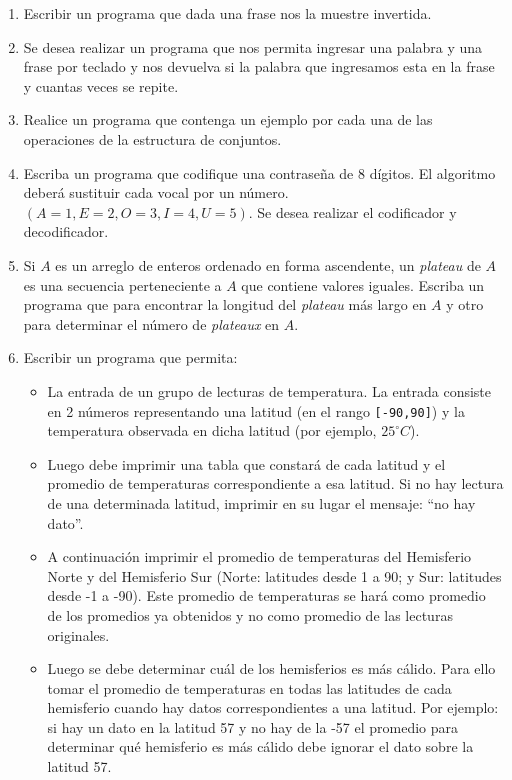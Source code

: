 \documentclass[a4paper,10pt]{article}
\begin{document}
\begin{enumerate}
\item Escribir un programa que dada una frase nos la muestre invertida.

\item Se desea realizar un programa que nos permita ingresar una palabra y una frase por teclado y nos devuelva si la palabra que ingresamos esta en la frase y cuantas veces se repite.

\item Realice un programa que contenga un ejemplo por cada una de las operaciones de la estructura de conjuntos.

\item Escriba un programa que codifique una contrase\~na de 8 d\'igitos. El algoritmo deber\'a sustituir cada vocal por un n\'umero. $(A=1, E=2, O=3, I=4, U=5)$. Se desea realizar el codificador y decodificador.

\item Si $A$ es un arreglo de enteros ordenado en forma ascendente, un \emph{plateau} de $A$ es una secuencia perteneciente a $A$ que contiene valores iguales. Escriba un programa que para encontrar la longitud del \emph{plateau} m\'as largo en $A$ y otro para determinar el n\'umero de \emph{plateaux} en $A$.

\item Escribir un programa que permita:
    \begin{itemize}
        \item[a-] La entrada de un grupo de lecturas de temperatura. La entrada consiste en 2 n\'umeros representando una latitud (en el rango \verb=[-90,90]=) y la temperatura observada en dicha latitud (por ejemplo, $25^\circ C$).
        \item[b-] Luego debe imprimir una tabla que constar\'a de cada latitud y el promedio de temperaturas correspondiente a esa latitud. Si no hay lectura de una determinada latitud, imprimir en su lugar el mensaje: ``no hay dato''.
        \item[c-] A continuaci\'on imprimir el promedio de temperaturas del Hemisferio Norte y del Hemisferio Sur (Norte: latitudes desde 1 a 90; y Sur: latitudes desde -1 a -90). Este promedio de temperaturas se har\'a como promedio de los promedios ya obtenidos y no como promedio de las lecturas originales.
        \item[d-] Luego se debe determinar cu\'al de los hemisferios es m\'as c\'alido. Para ello tomar el promedio de temperaturas en todas las latitudes de cada hemisferio cuando hay datos correspondientes a una latitud. Por ejemplo: si hay un dato en la latitud 57 y no hay de la -57 el promedio para determinar qu\'e hemisferio es m\'as c\'alido debe ignorar el dato sobre la latitud 57.
    \end{itemize}


\end{enumerate}
\end{document}
